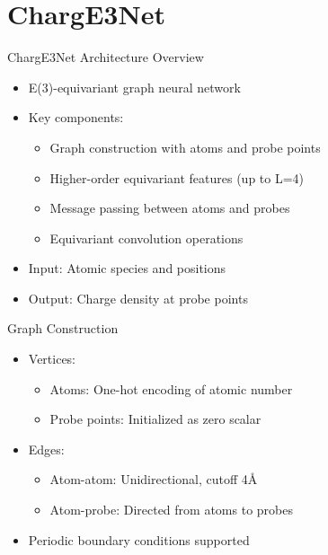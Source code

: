 \section{ChargE3Net}

\begin{frame}{ChargE3Net Architecture Overview}
    \begin{itemize}
        \item E(3)-equivariant graph neural network
        \item Key components:
        \begin{itemize}
            \item Graph construction with atoms and probe points
            \item Higher-order equivariant features (up to L=4)
            \item Message passing between atoms and probes
            \item Equivariant convolution operations
        \end{itemize}
        \item Input: Atomic species and positions
        \item Output: Charge density at probe points
    \end{itemize}
\end{frame}

\begin{frame}{Graph Construction}
    \begin{itemize}
        \item Vertices:
        \begin{itemize}
            \item Atoms: One-hot encoding of atomic number
            \item Probe points: Initialized as zero scalar
        \end{itemize}
        \item Edges:
        \begin{itemize}
            \item Atom-atom: Unidirectional, cutoff 4Å
            \item Atom-probe: Directed from atoms to probes
        \end{itemize}
        \item Periodic boundary conditions supported
    \end{itemize}
\end{frame}

